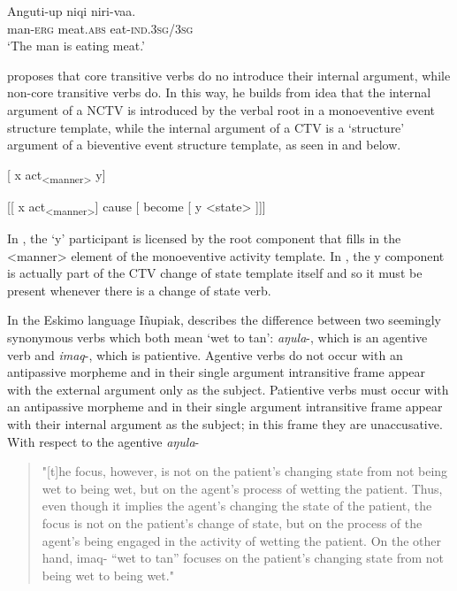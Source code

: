 \documentclass[output=paper,colorlinks,citecolor=brown,modfonts,nonflat]{langsci/langscibook}
\begin{document}
    \ex \label{ex:basilico:4b}
    \gll Anguti-up  niqi    niri-vaa.\\
    man{}-\textsc{{erg}}  meat.\textsc{{abs}}  eat{}-\textsc{{ind}}.3\textsc{sg}/3\textsc{sg}
    \\
    \glt `The man is eating meat.'
    \z
    \z


\citet{Basilico2017} proposes that core transitive verbs do no introduce their internal argument, while non-core transitive verbs do. In this way, he builds from  idea that the internal argument of a NCTV is introduced by the verbal root in a monoeventive event structure template, while the internal argument of a CTV is a ‘structure’ argument of a bieventive event structure template, as seen in  and  below.

\ea%
    \label{ex:basilico:5}
     {[} x act\textsubscript{<manner>} y{]}
    \z

\ea%
    \label{ex:basilico:6}
     {[}{[} x act\textsubscript{<manner>}{]} cause {[} become  {[} y <state> {]}{]}{]}
    \z

In , the ‘y’ participant is licensed by the root component that fills in the <manner> element of the monoeventive activity template. In , the y component is actually part of the CTV change of state template itself and so it must be present whenever there is a change of state verb.

In the Eskimo language Iñupiak, \citet{Nagai2006} describes the difference between two seemingly synonymous verbs which both mean ‘wet to tan’: \textit{aŋula}-, which is an agentive verb and \textit{imaq}{}-, which is patientive. Agentive verbs do not occur with an antipassive morpheme and in their single argument intransitive frame appear with the external argument only as the subject. Patientive verbs must occur with an antipassive morpheme and in their single argument intransitive frame appear with their internal argument as the subject; in this frame they are unaccusative. With respect to the agentive \textit{aŋula}{}-

\begin{quote}
"[t]he focus, however, is not on the patient’s changing state from not being wet to being wet, but on the agent’s process of wetting the patient. Thus, even though it implies the agent’s changing the state of the patient, the focus is not on the patient’s change of state, but on the process of the agent’s being engaged in the activity of wetting the patient. On the other hand, imaq- “wet to tan” focuses on the patient’s changing state from not being wet to being wet." \citep[??]{Nagai2006}
\end{quote}
\end{document}
